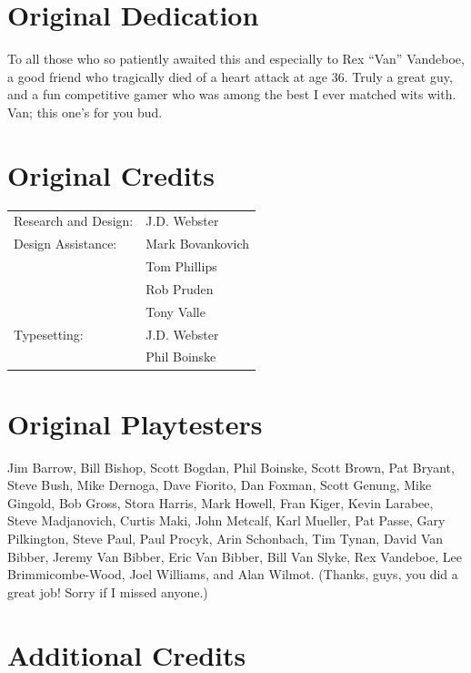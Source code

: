 \section*{Original Dedication}

To all those who so patiently awaited this and especially to Rex “Van” Vandeboe, a good friend who tragically died of a heart attack at age 36. Truly a great guy, and a fun competitive gamer who was among the best I ever matched wits with. Van; this one’s for you bud.

\section*{Original Credits}

\noindent
\begin{tabularx}{\linewidth}{@{}LL@{}}
    Research and Design: &J.D. Webster\\[1ex]
    Design Assistance:   &Mark Bovankovich\\
    &Tom Phillips\\
    &Rob Pruden\\
    &Tony Valle\\[1ex]
    Typesetting:         &J.D. Webster\\
    &Phil Boinske\\
\end{tabularx}

\section*{Original Playtesters}

{
    \sloppy
    Jim Barrow, Bill Bishop, Scott Bogdan, Phil Boinske, Scott Brown, Pat Bryant, Steve Bush, Mike Dernoga, Dave Fiorito, Dan Foxman, Scott Genung, Mike Gingold, Bob Gross, Stora Harris, Mark Howell, Fran Kiger, Kevin Larabee, Steve Madjanovich, Curtis Maki, John Metcalf, Karl Mueller, Pat Passe, Gary Pilkington, Steve Paul, Paul Procyk, Arin Schonbach, Tim Tynan, David Van Bibber, Jeremy Van Bibber, Eric Van Bibber, Bill Van Slyke, Rex Vandeboe, Lee Brimmicombe-Wood, Joel Williams, and Alan Wilmot.
    (Thanks, guys, you did a great job! Sorry if I missed anyone.)
}

\section*{Additional Credits}


